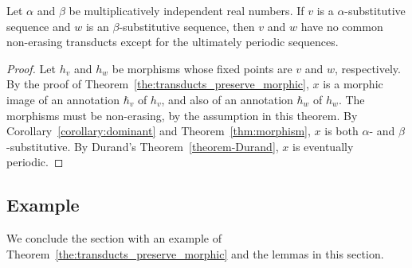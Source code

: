\begin{theorem}
  Let $\alpha$ and $\beta$ be  multiplicatively independent real numbers.
 If $v$ is a $\alpha$-substitutive sequence and $w$ is an $\beta$-substitutive sequence,
  then $v$ and $w$ have
 no common non-erasing transducts except for the ultimately periodic sequences. 
\label{theorem-apply-Durand}
\end{theorem}

\begin{proof} 
Let $h_v$ and $h_w$ be morphisms whose fixed points are $v$ and $w$, respectively.
  By the proof of Theorem~\ref{the:transducts_preserve_morphic}, 
  $x$ is a morphic image of an annotation  $\hbar_v$ 
  of $h_v$, and also of an annotation $\hbar_w$ of $h_w$.  
  The morphisms must be non-erasing, by the assumption in this theorem.
By  Corollary~\ref{corollary:dominant} and Theorem~\ref{thm:morphism}, 
  $x$ is both $\alpha$- and $\beta$-substitutive.
  By Durand's Theorem~\ref{theorem-Durand}, $x$ is eventually periodic.
\end{proof}

\subsection{Example}

We conclude the section with an example of Theorem~\ref{the:transducts_preserve_morphic}
and the lemmas in this section.

